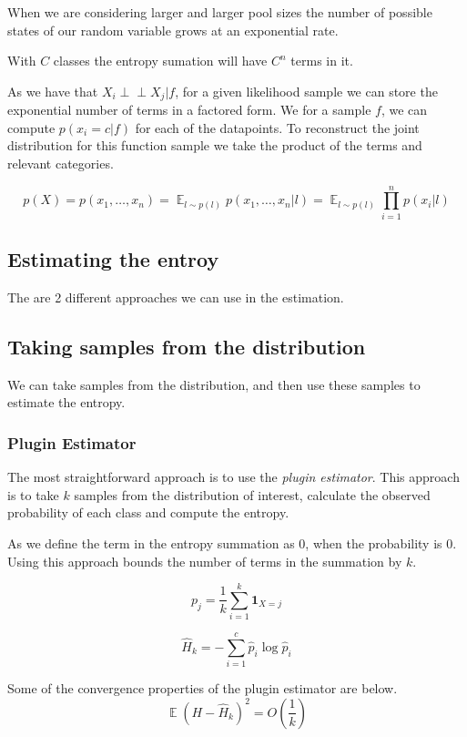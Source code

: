 \documentclass[12pt, a4paper]{report}
\theoremstyle{definition}
\theoremstyle{definition}
\theoremstyle{definition}
\DeclareMathOperator{\E}{\mathbb{E}}
\begin{document}
When we are considering larger and larger pool sizes the number of possible states of our random variable grows at an exponential rate.

With $C$ classes the entropy sumation will have $C^n$ terms in it. 

As we have that $ X_i \perp\!\!\!\perp X_j | f$, for a given likelihood sample we can store the exponential number of terms in a factored form. We for a sample $f$, we can compute $p(x_i = c | f)$ for each of the datapoints. To reconstruct the joint distribution for this function sample we take the product of the terms and relevant categories.


$$ p(X) = p(x_1, \ldots, x_n) = \E_{l \sim p(l)}  p(x_1, \ldots, x_n | l) = \E_{l \sim p(l)} \prod_{i=1}^n  p(x_i| l)$$

\subsection{Estimating the entroy}

The are 2 different approaches we can use in the estimation.

\subsection{Taking samples from the distribution}

We can take samples from the distribution, and then use these samples to estimate the entropy.



\subsubsection{Plugin Estimator}
The most straightforward approach is to use the \textit{plugin estimator}. This approach is to take $k$ samples from the distribution of interest, calculate the observed probability of each class and compute the entropy.

As we define the term in the entropy summation as $0$, when the probability is $0$. Using this approach bounds the number of terms in the summation by $k$.

$$p_j = \frac{1}{k} \sum_{i=1}^k \mathbf{1}_{X = j} $$

$$\hat{H}_k = - \sum_{i=1}^{c} \hat{p}_i \log{\hat{p}_i}$$


Some of the convergence properties of the plugin estimator are below.
$$\E \left(H - \hat{H}_k \right)^2 = O \left ( \frac{1}{k} \right) $$
\end{document}
